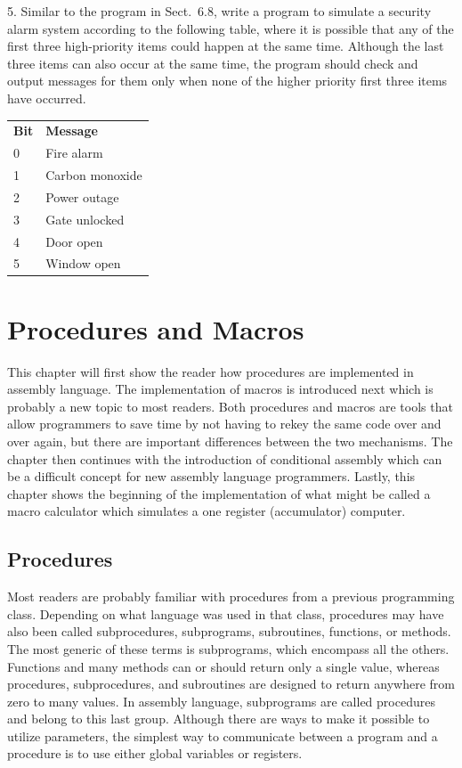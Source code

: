 \documentclass[10pt]{book}
\begin{document}
5. Similar to the program in Sect.\ 6.8, write a program to simulate a security alarm system according to the following table, where it is possible that any of the first three high-priority items could happen at the same time. Although the last three items can also occur at the same time, the program should check and output messages for them only when none of the higher priority first three items have occurred.

\begin{tabular}{ll}
\textbf{Bit} & \textbf{Message} \\
0 & Fire alarm \\
1 & Carbon monoxide \\
2 & Power outage \\
3 & Gate unlocked \\
4 & Door open \\
5 & Window open \\
\end{tabular}

\section{Procedures and Macros}
This chapter will first show the reader how procedures are implemented in assembly language. The implementation of macros is introduced next which is probably a new topic to most readers. Both procedures and macros are tools that allow programmers to save time by not having to rekey the same code over and over again, but there are important differences between the two mechanisms. The chapter then continues with the introduction of conditional assembly which can be a difficult concept for new assembly language programmers. Lastly, this chapter shows the beginning of the implementation of what might be called a macro calculator which simulates a one register (accumulator) computer.

\subsection{Procedures}
Most readers are probably familiar with procedures from a previous programming class. Depending on what language was used in that class, procedures may have also been called subprocedures, subprograms, subroutines, functions, or methods. The most generic of these terms is subprograms, which encompass all the others. Functions and many methods can or should return only a single value, whereas procedures, subprocedures, and subroutines are designed to return anywhere from zero to many values. In assembly language, subprograms are called procedures and belong to this last group. Although there are ways to make it possible to utilize parameters, the simplest way to communicate between a program and a procedure is to use either global variables or registers.
\end{document}

